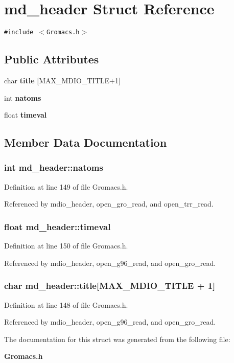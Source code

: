 \section{md\_\-header  Struct Reference}
\label{structmd__header}
{\tt \#include $<$Gromacs.h$>$}

\subsection*{Public Attributes}
\begin{CompactItemize}
\item 
char {\bf title} [MAX\_\-MDIO\_\-TITLE+1]
\item 
int {\bf natoms}
\item 
float {\bf timeval}
\end{CompactItemize}


\subsection{Member Data Documentation}
\subsubsection{\setlength{\rightskip}{0pt plus 5cm}int md\_\-header::natoms}\label{structmd__header_m1}




Definition at line 149 of file Gromacs.h.

Referenced by mdio\_\-header, open\_\-gro\_\-read, and open\_\-trr\_\-read.
\subsubsection{\setlength{\rightskip}{0pt plus 5cm}float md\_\-header::timeval}\label{structmd__header_m2}




Definition at line 150 of file Gromacs.h.

Referenced by mdio\_\-header, open\_\-g96\_\-read, and open\_\-gro\_\-read.
\subsubsection{\setlength{\rightskip}{0pt plus 5cm}char md\_\-header::title[MAX\_\-MDIO\_\-TITLE + 1]}\label{structmd__header_m0}




Definition at line 148 of file Gromacs.h.

Referenced by mdio\_\-header, open\_\-g96\_\-read, and open\_\-gro\_\-read.

The documentation for this struct was generated from the following file:\begin{CompactItemize}
\item 
{\bf Gromacs.h}\end{CompactItemize}
